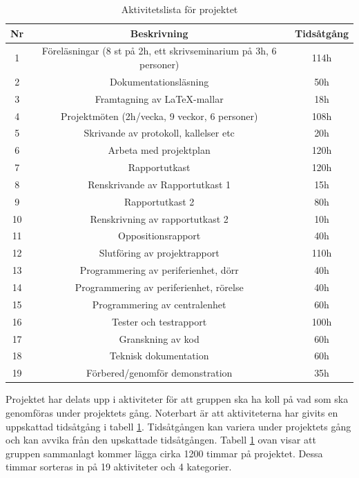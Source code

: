 \documentclass[a4paper]{article}
\begin{document}
\begin{table}[H]
    \begin{center}
        \begin{tabular}{ |c|c|c| }\hline
            Nr & Beskrivning & Tidsåtgång \\\hline\hline
            1 & Föreläsningar (8 st på 2h, ett skrivseminarium på 3h, 6 personer) & 114h \\\hline
            2 & Dokumentationsläsning & 50h \\\hline
            3 & Framtagning av LaTeX-mallar & 18h \\\hline
            4 & Projektmöten (2h/vecka, 9 veckor, 6 personer) & 108h \\\hline
            5 & Skrivande av protokoll, kallelser etc & 20h \\\hline
            6 & Arbeta med projektplan & 120h \\\hline
            7 & Rapportutkast & 120h \\\hline
            8 & Renskrivande av Rapportutkast 1 & 15h \\\hline
            9 & Rapportutkast 2 & 80h\\\hline
            10 & Renskrivning av rapportutkast 2 & 10h \\\hline
            11 & Oppositionsrapport & 40h\\\hline
            12 & Slutföring av projektrapport & 110h\\\hline
            13 & Programmering av periferienhet, dörr & 40h \\\hline
            14 & Programmering av periferienhet, rörelse & 40h \\\hline
            15 & Programmering av centralenhet & 60h \\\hline
            16 & Tester och testrapport & 100h\\\hline
            17 & Granskning av kod & 60h \\\hline
            18 & Teknisk dokumentation & 60h \\\hline
            19 & Förbered/genomför demonstration & 35h \\\hline
        \end{tabular}
        \caption{Aktivitetslista för projektet}
        \label{table:aktivitetslista}
    \end{center}
\end{table}

Projektet har delats upp i aktiviteter för att gruppen ska ha koll på vad som ska genomföras under projektets gång. Noterbart är att aktiviteterna har givits en uppskattad tidsåtgång i tabell \ref{table:aktivitetslista}. Tidsåtgången kan variera under projektets gång och kan avvika från den upskattade tidsåtgången. Tabell \ref{table:aktivitetslista} ovan visar att gruppen sammanlagt kommer lägga cirka 1200 timmar på projektet. Dessa timmar sorteras in på 19 aktiviteter och 4 kategorier.
\end{document}

